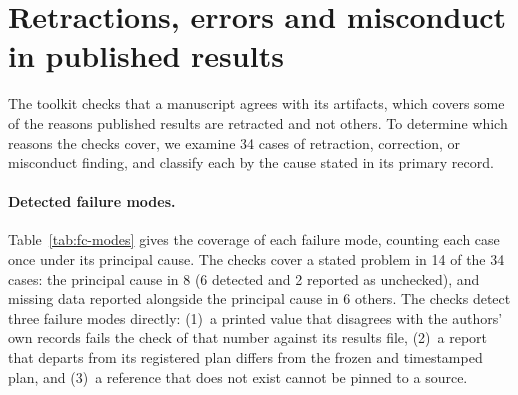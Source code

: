 
\section{Retractions, errors and misconduct in published results}
\label{sec:failure-cases}

The toolkit checks that a manuscript agrees with its artifacts, which covers some of the
reasons published results are retracted and not others. To determine which reasons the checks
cover, we examine 34 cases of retraction, correction, or misconduct finding, and classify each
by the cause stated in its primary record.

\paragraph{Detected failure modes.} Table~\ref{tab:fc-modes} gives the coverage of
each failure mode, counting each case once under its principal cause. The checks
cover a stated problem in 14 of the 34 cases: the principal cause in 8 (6 detected and 2
reported as unchecked), and missing data reported
alongside the principal cause in 6 others. The checks detect three failure modes directly: (1)~a printed value that
disagrees with the authors' own records fails the check of that number against its results
file, (2)~a report that departs from its registered plan differs from the frozen and
timestamped plan, and (3)~a reference that does not exist cannot be pinned to a source.

